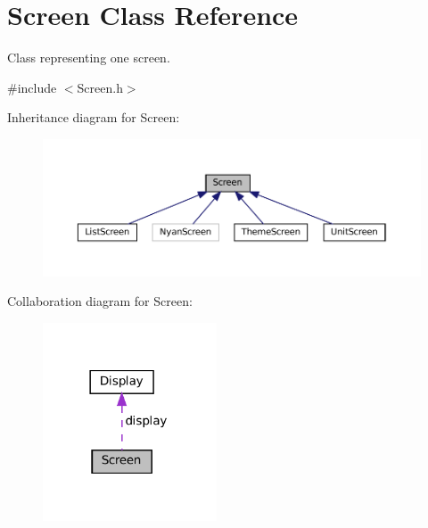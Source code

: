 \hypertarget{classScreen}{}\section{Screen Class Reference}
\label{classScreen}


Class representing one screen.  




{\ttfamily \#include $<$Screen.\+h$>$}



Inheritance diagram for Screen\+:
\nopagebreak
\begin{figure}[H]
\begin{center}
\leavevmode
\includegraphics[width=350pt]{classScreen__inherit__graph}
\end{center}
\end{figure}


Collaboration diagram for Screen\+:\nopagebreak
\begin{figure}[H]
\begin{center}
\leavevmode
\includegraphics[width=146pt]{classScreen__coll__graph}
\end{center}
\end{figure}
